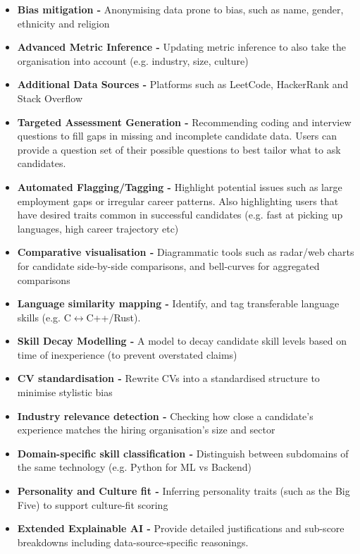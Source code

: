 \begin{itemize}
  \item \textbf{Bias mitigation -} Anonymising data prone to bias, such as name, gender, ethnicity and religion
  \item \textbf{Advanced Metric Inference -} Updating metric inference to also take the organisation into account (e.g. industry, size, culture)
  \item \textbf{Additional Data Sources -} Platforms such as LeetCode, HackerRank and Stack Overflow
  \item \textbf{Targeted Assessment Generation -} Recommending coding and interview questions to fill gaps in missing and incomplete candidate data. Users can provide a question set of their possible questions to best tailor what to ask candidates.
  \item \textbf{Automated Flagging/Tagging -} Highlight potential issues such as large employment gaps or irregular career patterns. Also highlighting users that have desired traits common in successful candidates (e.g. fast at picking up languages, high career trajectory etc)
  \item \textbf{Comparative visualisation -} Diagrammatic tools such as radar/web charts for candidate side-by-side comparisons, and bell-curves for aggregated comparisons
  \item \textbf{Language similarity mapping -} Identify, and tag transferable language skills (e.g. C\(\leftrightarrow\)C++/Rust).
  \item \textbf{Skill Decay Modelling -} A model to decay candidate skill levels based on time of inexperience (to prevent overstated claims)
  \item \textbf{CV standardisation -} Rewrite CVs into a standardised structure to minimise stylistic bias
  \item \textbf{Industry relevance detection -} Checking how close a candidate's experience matches the hiring organisation's size and sector
  \item \textbf{Domain-specific skill classification -} Distinguish between subdomains of the same technology (e.g. Python for ML vs Backend)
  \item \textbf{Personality and Culture fit -} Inferring personality traits (such as the Big Five) to support culture-fit scoring
  \item \textbf{Extended Explainable AI -} Provide detailed justifications and sub-score breakdowns including data-source-specific reasonings.
\end{itemize}

